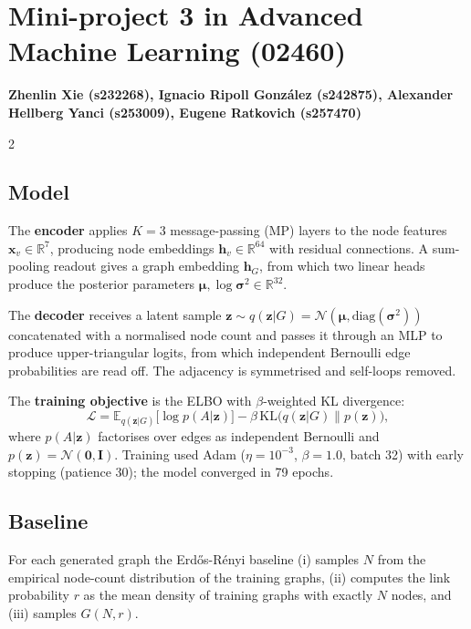 \documentclass[10pt,a4paper]{article}
\begin{document}
\section*{Mini-project 3 in Advanced Machine Learning (02460)}
\textbf{Zhenlin Xie (s232268), Ignacio Ripoll Gonz\'alez (s242875), Alexander Hellberg Yanci (s253009), Eugene Ratkovich (s257470)}

\begin{multicols}{2}

\subsection*{Model}
The \textbf{encoder} applies $K{=}3$ message-passing (MP) layers to the node features $\mathbf{x}_v \in \mathbb{R}^7$, producing node embeddings $\mathbf{h}_v \in \mathbb{R}^{64}$ with residual connections. A sum-pooling readout gives a graph embedding $\mathbf{h}_G$, from which two linear heads produce the posterior parameters $\boldsymbol{\mu}, \log\boldsymbol{\sigma}^2 \in \mathbb{R}^{32}$.

The \textbf{decoder} receives a latent sample $\mathbf{z} \sim q(\mathbf{z}|G) = \mathcal{N}(\boldsymbol{\mu}, \text{diag}(\boldsymbol{\sigma}^2))$ concatenated with a normalised node count and passes it through an MLP to produce upper-triangular logits, from which independent Bernoulli edge probabilities are read off. The adjacency is symmetrised and self-loops removed.

The \textbf{training objective} is the ELBO with $\beta$-weighted KL divergence:
\[
\mathcal{L} = \mathbb{E}_{q(\mathbf{z}|G)}\!\bigl[\log p(A|\mathbf{z})\bigr] - \beta\,\mathrm{KL}\!\bigl(q(\mathbf{z}|G)\|p(\mathbf{z})\bigr),
\]
where $p(A|\mathbf{z})$ factorises over edges as independent Bernoulli and $p(\mathbf{z})=\mathcal{N}(\mathbf{0},\mathbf{I})$.
Training used Adam ($\eta{=}10^{-3}$, $\beta{=}1.0$, batch 32) with early stopping (patience 30); the model converged in 79 epochs.

\subsection*{Baseline}
For each generated graph the Erd\H{o}s-R\'enyi baseline (i) samples $N$ from the empirical node-count distribution of the training graphs, (ii) computes the link probability $r$ as the mean density of training graphs with exactly $N$ nodes, and (iii) samples $G(N,r)$.


\end{multicols}
\end{document}
